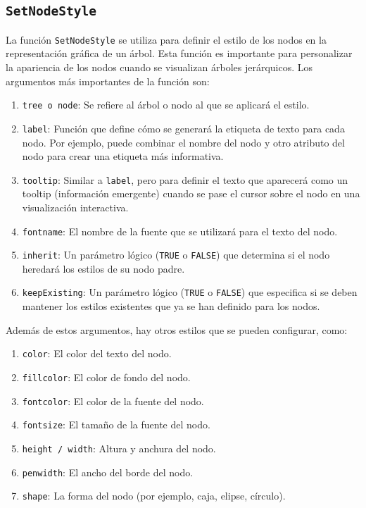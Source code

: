 \documentclass[12pt]{report}\usepackage[]{graphicx}\usepackage[dvipsnames]{xcolor}
\begin{document}
		 	\subsection{\texttt{SetNodeStyle}}
			 	
			 	La función \texttt{SetNodeStyle} se utiliza para definir el estilo de los nodos en la representación gráfica de un árbol. Esta función es importante para personalizar la apariencia de los nodos cuando se visualizan árboles jerárquicos. Los argumentos más importantes de la función son:
			 	
			 	\begin{enumerate}[label = \textbf{\arabic*.}]
			 		\item \texttt{tree o node}: Se refiere al árbol o nodo al que se aplicará el estilo.
			 		
			 		\item \texttt{label}: Función que define cómo se generará la etiqueta de texto para cada nodo. Por ejemplo, puede combinar el nombre del nodo y otro atributo del nodo para crear una etiqueta más informativa.
			 		
			 		\item \texttt{tooltip}: Similar a \texttt{label}, pero para definir el texto que aparecerá como un tooltip (información emergente) cuando se pase el cursor sobre el nodo en una visualización interactiva.
			 		
			 		\item \texttt{fontname}: El nombre de la fuente que se utilizará para el texto del nodo.
			 		
			 		\item \texttt{inherit}: Un parámetro lógico (\texttt{TRUE} o \texttt{FALSE}) que determina si el nodo heredará los estilos de su nodo padre.
			 		
			 		\item \texttt{keepExisting}: Un parámetro lógico (\texttt{TRUE} o \texttt{FALSE}) que especifica si se deben mantener los estilos existentes que ya se han definido para los nodos.
		 		\end{enumerate}
		 		\noindent Además de estos argumentos, hay otros estilos que se pueden configurar, como:
		 		\begin{enumerate}[label = \textbf{\arabic*.}]
			 		\item \texttt{color}: El color del texto del nodo.
			 		\item \texttt{fillcolor}: El color de fondo del nodo.
			 		\item \texttt{fontcolor}: El color de la fuente del nodo.
			 		\item \texttt{fontsize}: El tamaño de la fuente del nodo.
			 		\item \texttt{height / width}: Altura y anchura del nodo.
			 		\item \texttt{penwidth}: El ancho del borde del nodo.
			 		\item \texttt{shape}: La forma del nodo (por ejemplo, caja, elipse, círculo).
			 	\end{enumerate}
			 	
\end{document}
